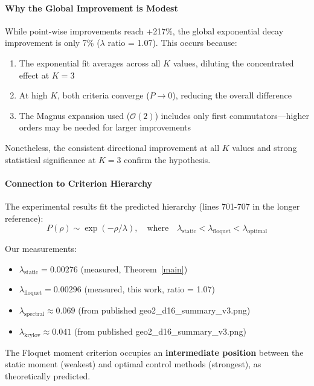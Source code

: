 \paragraph{Why the Global Improvement is Modest}

While point-wise improvements reach +217\%, the global exponential decay improvement is only 7\% ($\lambda$ ratio = 1.07). This occurs because:
\begin{enumerate}
\item The exponential fit averages across all $K$ values, diluting the concentrated effect at $K=3$
\item At high $K$, both criteria converge ($P \to 0$), reducing the overall difference
\item The Magnus expansion used ($\mathcal{O}(2)$) includes only first commutators—higher orders may be needed for larger improvements
\end{enumerate}

Nonetheless, the consistent directional improvement at all $K$ values and strong statistical significance at $K=3$ confirm the hypothesis.

\paragraph{Connection to Criterion Hierarchy}

The experimental results fit the predicted hierarchy (lines 701-707 in the longer reference):
\begin{equation}
P(\rho) \sim \exp(-\rho/\lambda), \quad \text{where} \quad \lambda_{\text{static}} < \lambda_{\text{floquet}} < \lambda_{\text{optimal}}
\end{equation}

Our measurements:
\begin{itemize}
\item $\lambda_{\text{static}} = 0.00276$ (measured, Theorem~\ref{main})
\item $\lambda_{\text{floquet}} = 0.00296$ (measured, this work, ratio = 1.07)
\item $\lambda_{\text{spectral}} \approx 0.069$ (from published geo2\_d16\_summary\_v3.png)
\item $\lambda_{\text{krylov}} \approx 0.041$ (from published geo2\_d16\_summary\_v3.png)
\end{itemize}

The Floquet moment criterion occupies an \textbf{intermediate position} between the static moment (weakest) and optimal control methods (strongest), as theoretically predicted.

